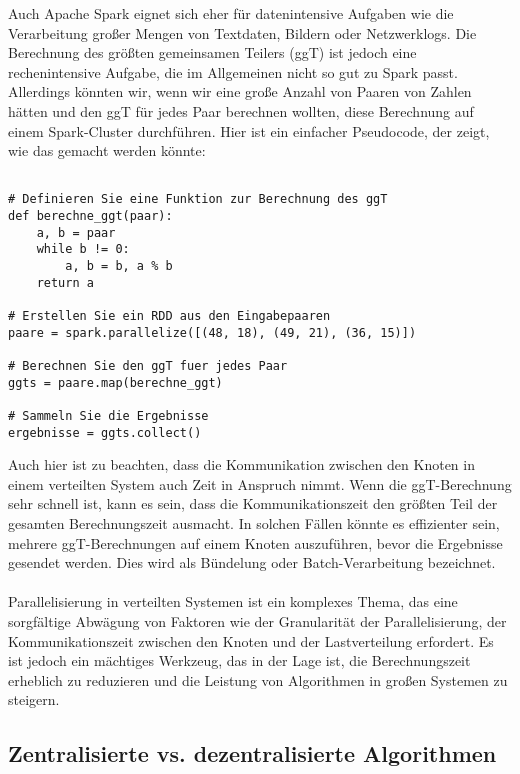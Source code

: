 Auch Apache Spark eignet sich eher für datenintensive Aufgaben wie die Verarbeitung großer Mengen von Textdaten, Bildern oder Netzwerklogs. Die Berechnung des größten gemeinsamen Teilers (ggT) ist jedoch eine rechenintensive Aufgabe, die im Allgemeinen nicht so gut zu Spark passt.
Allerdings könnten wir, wenn wir eine große Anzahl von Paaren von Zahlen hätten und den ggT für jedes Paar berechnen wollten, diese Berechnung auf einem Spark-Cluster durchführen. Hier ist ein einfacher Pseudocode, der zeigt, wie das gemacht werden könnte:
\begin{lstlisting}[caption={RDD Spark},captionpos=b,label={lst:spark}]

# Definieren Sie eine Funktion zur Berechnung des ggT
def berechne_ggt(paar):
    a, b = paar
    while b != 0:
        a, b = b, a % b
    return a

# Erstellen Sie ein RDD aus den Eingabepaaren
paare = spark.parallelize([(48, 18), (49, 21), (36, 15)])

# Berechnen Sie den ggT fuer jedes Paar
ggts = paare.map(berechne_ggt)

# Sammeln Sie die Ergebnisse
ergebnisse = ggts.collect()
\end{lstlisting}
Auch hier ist zu beachten, dass die Kommunikation zwischen den Knoten in einem verteilten System auch Zeit in Anspruch nimmt. Wenn die ggT-Berechnung sehr schnell ist, kann es sein, dass die Kommunikationszeit den größten Teil der gesamten Berechnungszeit ausmacht. In solchen Fällen könnte es effizienter sein, mehrere ggT-Berechnungen auf einem Knoten auszuführen, bevor die Ergebnisse gesendet werden. Dies wird als Bündelung oder Batch-Verarbeitung bezeichnet.
\\\\
Parallelisierung in verteilten Systemen ist ein komplexes Thema, das eine sorgfältige Abwägung von Faktoren wie der Granularität der Parallelisierung, der Kommunikationszeit zwischen den Knoten und der Lastverteilung erfordert. Es ist jedoch ein mächtiges Werkzeug, das in der Lage ist, die Berechnungszeit erheblich zu reduzieren und die Leistung von Algorithmen in großen Systemen zu steigern.


\subsection{Zentralisierte vs. dezentralisierte Algorithmen}

